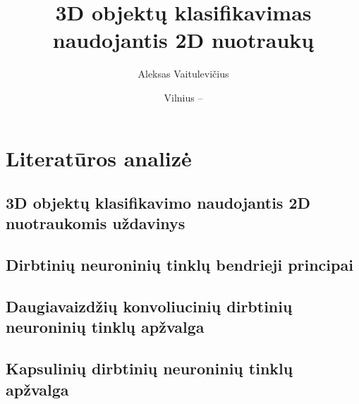 \documentclass{VUMIFInfMagistrinis}
\title{3D objektų klasifikavimas naudojantis 2D nuotraukų}
\author{Aleksas Vaitulevičius}
\date{Vilnius – \the\year}
\begin{document}
\maketitle



\tableofcontents





\section{Literatūros analizė}

\subsection{3D objektų klasifikavimo naudojantis 2D nuotraukomis uždavinys}


\subsection{Dirbtinių neuroninių tinklų bendrieji principai}




\subsection{Daugiavaizdžių konvoliucinių dirbtinių neuroninių tinklų apžvalga}




\subsection{Kapsulinių dirbtinių neuroninių tinklų apžvalga}

\end{document}

